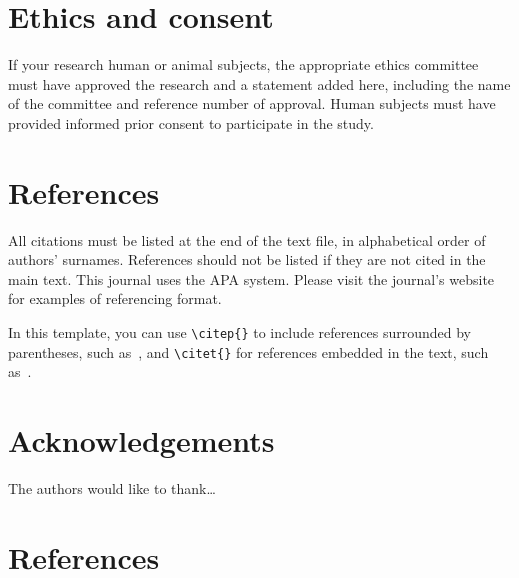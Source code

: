 \documentclass{article}
\begin{document}
\section{Ethics and consent}

If your research human or animal subjects, the appropriate ethics
committee must have approved the research and a statement added here,
including the name of the committee and reference number of approval.
Human subjects must have provided informed prior consent
to participate in the study.

\section{References}

All citations must be listed at the end of the text file,
in alphabetical order of authors' surnames.
References should not be listed if they are not cited in
the main text.
This journal uses the APA system.
Please visit the journal's website
for examples of referencing format.

In this template, you can use \verb=\citep{}= to include references
surrounded by parentheses, such as~\citep{Author:00}, and \verb=\citet{}=
for references embedded in the text, such as~\cite{Author:00}.

\section*{Acknowledgements}

The authors would like to thank\dots

\theendnotes

{
\section*{References}

}
%
%
%
%
\end{document}

